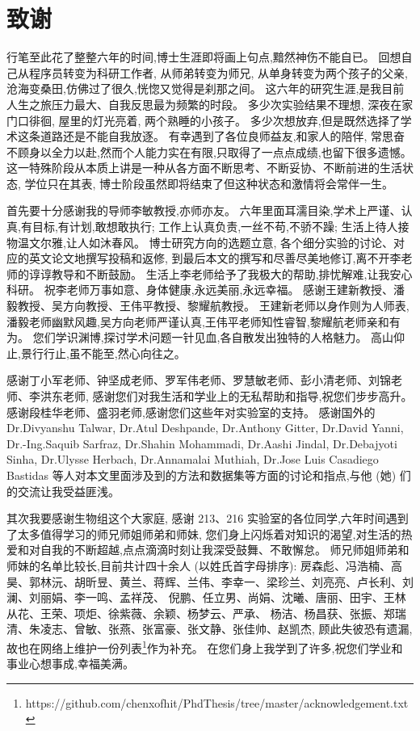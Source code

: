\section{致谢} %

行笔至此花了整整六年的时间,博士生涯即将画上句点,黯然神伤不能自已。
回想自己从程序员转变为科研工作者,
从师弟转变为师兄,
从单身转变为两个孩子的父亲,
沧海变桑田,仿佛过了很久,恍惚又觉得是刹那之间。
这六年的研究生涯,是我目前人生之旅压力最大、自我反思最为频繁的时段。
多少次实验结果不理想, 深夜在家门口徘徊, 屋里的灯光亮着, 两个熟睡的小孩子。
多少次想放弃,但是既然选择了学术这条道路还是不能自我放逐。
有幸遇到了各位良师益友,和家人的陪伴,
常思奋不顾身以全力以赴,然而个人能力实在有限,只取得了一点点成绩,也留下很多遗憾。
这一特殊阶段从本质上讲是一种从各方面不断思考、不断妥协、不断前进的生活状态,
学位只在其表,
博士阶段虽然即将结束了但这种状态和激情将会常伴一生。

首先要十分感谢我的导师李敏教授,亦师亦友。
六年里面耳濡目染,学术上严谨、认真,有目标,有计划,敢想敢执行;
工作上认真负责,一丝不苟,不骄不躁;
生活上待人接物温文尔雅,让人如沐春风。
博士研究方向的选题立意,
各个细分实验的讨论、对应的英文论文地撰写投稿和返修,
到最后本文的撰写和尽善尽美地修订,离不开李老师的谆谆教导和不断鼓励。
生活上李老师给予了我极大的帮助,排忧解难,让我安心科研。
祝李老师万事如意、身体健康,永远美丽,永远幸福。
感谢王建新教授、潘毅教授、吴方向教授、王伟平教授、黎耀航教授。
王建新老师以身作则为人师表,潘毅老师幽默风趣,吴方向老师严谨认真,王伟平老师知性睿智,黎耀航老师亲和有为。
您们学识渊博,探讨学术问题一针见血,各自散发出独特的人格魅力。
高山仰止,景行行止,虽不能至,然心向往之。

感谢丁小军老师、钟坚成老师、罗军伟老师、罗慧敏老师、彭小清老师、刘锦老师、李洪东老师,
感谢您们对我生活和学业上的无私帮助和指导,祝您们步步高升。
感谢段桂华老师、盛羽老师,感谢您们这些年对实验室的支持。
感谢国外的 Dr.Divyanshu Talwar, Dr.Atul Deshpande, Dr.Anthony Gitter, Dr.David Yanni,
 Dr.-Ing.Saquib Sarfraz, Dr.Shahin Mohammadi, Dr.Aashi Jindal, Dr.Debajyoti Sinha, Dr.Ulysse Herbach, Dr.Annamalai Muthiah, Dr.Jose Luis Casadiego Bastidas
等人对本文里面涉及到的方法和数据集等方面的讨论和指点,与他 (她) 们的交流让我受益匪浅。


其次我要感谢生物组这个大家庭,
感谢 213、216 实验室的各位同学,六年时间遇到了太多值得学习的师兄师姐师弟和师妹,
您们身上闪烁着对知识的渴望,对生活的热爱和对自我的不断超越,点点滴滴时刻让我深受鼓舞、不敢懈怠。
师兄师姐师弟和师妹的名单比较长,目前共计四十余人 (以姓氏首字母排序): 房森彪、冯浩楠、高昊、郭林沅、胡昕昱、黄兰、蒋辉、兰伟、李幸一、梁珍兰、刘亮亮、卢长利、刘澜、刘丽娟、李一鸣、孟祥茂、
倪鹏、任立男、尚娟、沈曦、唐丽、田宇、王林从花、王荣、项炬、徐紫薇、余颖、杨梦云、严承、 杨洁、杨昌获、张振、郑瑞清、朱凌志、曾敏、张燕、张富豪、张文静、张佳帅、赵凯杰,
顾此失彼恐有遗漏,故也在网络上维护一份列表\footnote{https://github.com/chenxofhit/PhdThesis/tree/master/acknowledgement.txt}作为补充。
在您们身上我学到了许多,祝您们学业和事业心想事成,幸福美满。

